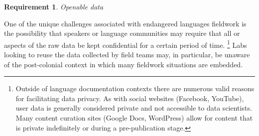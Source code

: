 \documentclass[11pt]{article}
\newtheorem{requirement}{Requirement}
\begin{document}
\begin{comment}
\begin{table}[h]
\begin{center}
\scriptsize
\begin{tabular}{llll}
      \toprule
      Stakeholders & Default Context & Mobile Context\\\hline\hline
     
      Language Community & Windows &  iPhone, Android\\
      \midrule

	Field Linguists & Mac, Windows, Linux & iPad, Android\\
	  & Praat, Javascript, LaTeX \\
	  \midrule

	Computational Linguists & Linux, Mac, Windows\\
	 & GATE, UIMA, Pip, NLTK\\
	\midrule

	Web Developers & Mac, Linux, Windows\\
	 & Brew, NPM\\

      \bottomrule

\end{tabular}
\caption{Contexts both in terms of operating systems and programming languages/frameworks where data and  data processes must be available.}
\label{requirements-contexts}
 \end{center}
 \normalsize
\end{table}
\end{comment}


\begin{requirement}
	\label{req:openable}
       Openable data
\end{requirement}

One of the unique challenges associated with endangered languages fieldwork is
the possibility that speakers or language communities may require that all or
aspects of the raw data be kept confidential for a certain period of time.%
\footnote{Outside of language documentation contexts there are numerous valid
    reasons for facilitating data privacy. As with social websites
    (Facebook, YouTube), user data is generally considered private and not
    accessible to data scientists. Many content curation sites (Google Docs,
    WordPress) allow for content that is private indefinitely or during a
pre-publication stage.} %
Labs looking to reuse the data collected by field teams may, in particular, be
unaware of the post-colonial context in which many fieldwork situations are
embedded.
\end{document}
